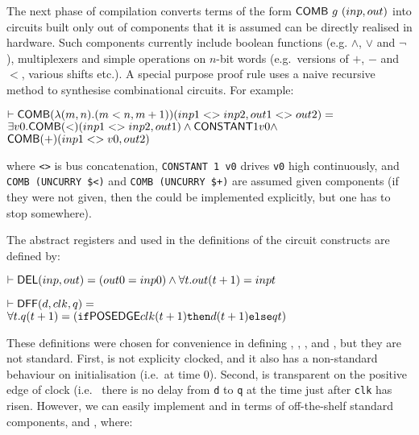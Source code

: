 The next phase of compilation converts terms of the form $\mathsf{COMB}~g~(inp,out)$
into circuits built only out of components that it is assumed can be directly realised in
hardware. Such components  currently include boolean functions (e.g. $\wedge$,
$\vee$ and $\neg$), multiplexers and simple operations  on $n$-bit words (e.g.~versions
of $+$, $-$ and $<$, various shifts etc.). 
A special purpose proof rule uses a naive recursive method to synthesise
combinational circuits. For example:

\vspace*{-2mm}

{\begin{alltt}
\( \vdash \DEF{COMB}({\lambda}(m,n). (m<n, m+1))(inp1<>inp2,out1<>out2) =              \)
\(     {\exists}v0. \DEF{COMB}({<})(inp1<>inp2,out1) \wedge \DEF{CONSTANT} 1 v0 \wedge \)
\(          \DEF{COMB}({+})(inp1<>v0,out2)                                              \)
\end{alltt}}
\vspace*{-2mm}

\noindent where {\verb+<>+} is bus concatenation,
{\verb+CONSTANT 1 v0+} drives \texttt{v0} high continuously, and
{\verb+COMB (UNCURRY $<)+} and {\verb&COMB (UNCURRY $+)&} are assumed
given components (if they were not given, then the could be
implemented explicitly, but one has to stop somewhere). 
 
The abstract registers  and  used in the definitions of
the circuit constructs are defined by:

\vspace*{-2mm}

{\begin{alltt}
\( \vdash \DEF{DEL}(inp,out) = (out 0 = inp 0) \wedge {\forall}t. out(t+1) = inp t                       \)

\( \vdash \DEF{DFF}(d,clk,q) =                                                                           \)
\(     {\forall}t. q(t+1) = (\texttt{if} \DEF{POSEDGE} clk (t+1) \texttt{then} d(t+1) \texttt{else} q t) \)
\end{alltt}}

\vspace*{-2mm}

These definitions were chosen for convenience in defining
, , ,  and , but they are not standard.
First,  is not explicity clocked, and it also has a
non-standard behaviour on initialisation (i.e.~at time $0$).  Second,
 is transparent on the positive edge of clock (i.e.~ there is
no delay from \texttt{d} to
\texttt{q} at the time just after \texttt{clk} has risen. 
However, we can easily implement  and  in terms of off-the-shelf
standard components,   and , where:

